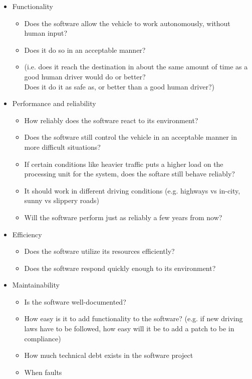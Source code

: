 \documentclass[letterpaper]{article}
\begin{document}
\begin{itemize}
	\item Functionality
		
	\begin{itemize}
		\item Does the software allow the vehicle to work autonomously, without human input? 
		\item Does it do so in an acceptable manner? 
		\item (i.e. does it reach the destination in about the same amount of time as a good human driver would do or better?\\
		 Does it do it as safe as, or better than a good human driver?)
	\end{itemize}
	\item Performance and reliability
	\begin{itemize}
		\item How reliably does the software react to its environment?
		\item Does the software still control the vehicle in an acceptable manner in more difficult situations?
		\item If certain conditions like heavier traffic puts a higher load on the processing unit for the system, does the softare still behave reliably?
		\item It should work in different driving conditions (e.g. highways vs in-city, sunny vs slippery roads)
		\item Will the software perform just as reliably a few years from now?
	\end{itemize}
		\item Efficiency
	\begin{itemize}
		\item Does the software utilize its resources efficiently?
		\item Does the software respond quickly enough to its environment?
	\end{itemize}
	\item Maintainability
	\begin{itemize}	
	\item Is the software well-documented?
		\item How easy is it to add functionality to the software? (e.g. if new driving laws have to be followed, how easy will it be to add a patch to be in compliance)
		\item How much technical debt exists in the software project
		\item When faults

\end{itemize}
\end{itemize}
\end{document}
